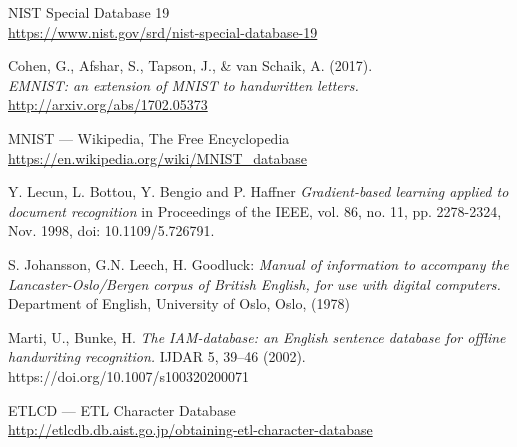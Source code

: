 \renewcommand\bibname{Ашигласан материал}
\begin{thebibliography}{9}
	NIST Special Database 19
	\\\url{https://www.nist.gov/srd/nist-special-database-19}

	Cohen, G., Afshar, S., Tapson, J., \& van Schaik, A. (2017).
	\\\textit{EMNIST: an extension of MNIST to handwritten letters.}
	\\\url{http://arxiv.org/abs/1702.05373}

	MNIST --- {W}ikipedia{,} The Free Encyclopedia
	\\\url{https://en.wikipedia.org/wiki/MNIST\_database}

	Y. Lecun, L. Bottou, Y. Bengio and P. Haffner
	\textit{Gradient-based learning applied to document recognition} in Proceedings of the IEEE, vol. 86, no. 11, pp. 2278-2324, Nov. 1998, doi: 10.1109/5.726791.

	S. Johansson, G.N. Leech, H. Goodluck: \textit{Manual of information to accompany the Lancaster-Oslo/Bergen corpus of British English, for use with digital computers.} Department of English, University of Oslo, Oslo, (1978)

	Marti, U., Bunke, H. \textit{The IAM-database: an English sentence database for offline handwriting recognition.} IJDAR 5, 39–46 (2002). https://doi.org/10.1007/s100320200071

	ETLCD --- ETL Character Database
	\\\url{http://etlcdb.db.aist.go.jp/obtaining-etl-character-database}

\end{thebibliography}
